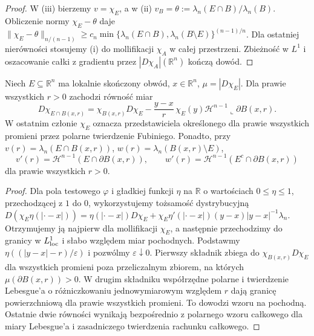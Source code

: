 \begin{proof}
W (iii) bierzemy $v=\chi_E$, a w (ii)
$v_B=\theta:=\lambda_n(E\cap B)/\lambda_n(B)$.
Obliczenie normy $\chi_E-\theta$ daje
$\|\chi_E-\theta\|_{n/(n-1)}\ge
 c_n\min\{\lambda_n(E\cap B),\lambda_n(B\setminus E)\}^{(n-1)/n}$.
Dla ostatniej nierówności stosujemy (i) do
mollifikacji $\chi_A$ w całej przestrzeni.
Zbieżność w $L^1$ i oszacowanie całki z gradientu
przez $|D\chi_A|(\mathbb R^n)$ kończą dowód.
\end{proof}

\begin{lemat}
\label{lem:dg-ball-cut}
Niech $E\subseteq\mathbb R^n$ ma lokalnie skończony obwód,
$x\in\mathbb R^n$, $\mu=|D\chi_E|$.
Dla prawie wszystkich $r>0$ zachodzi równość miar
\[
 D\chi_{E\cap B(x,r)}
 =\chi_{B(x,r)}D\chi_E
 -\frac{y-x}{r}\,\chi_E(y)
 \mathcal H^{n-1}\llcorner\partial B(x,r).
\]
W ostatnim członie $\chi_E$ oznacza przedstawiciela
określonego dla prawie wszystkich promieni przez
polarne twierdzenie Fubiniego. Ponadto, przy
$v(r)=\lambda_n(E\cap B(x,r))$,
$w(r)=\lambda_n(B(x,r)\setminus E)$,
\[
 v'(r)=\mathcal H^{n-1}(E\cap\partial B(x,r)),\qquad
 w'(r)=\mathcal H^{n-1}(E^c\cap\partial B(x,r))
\]
dla prawie wszystkich $r>0$.
\end{lemat}
\begin{proof}
Dla pola testowego $\varphi$ i gładkiej
funkcji $\eta$ na $\mathbb R$ o wartościach
$0\le\eta\le1$, przechodzącej z $1$ do $0$,
wykorzystujemy tożsamość dystrybucyjną
$D(\chi_E\eta(|\cdot-x|))=
\eta(|\cdot-x|)D\chi_E+
\chi_E\eta'(|\cdot-x|)(y-x)|y-x|^{-1}\lambda_n$.
Otrzymujemy ją najpierw dla mollifikacji $\chi_E$,
a następnie przechodzimy do granicy w $L^1_{\rm loc}$
i słabo względem miar pochodnych. Podstawmy
$\eta((|y-x|-r)/\varepsilon)$ i pozwólmy
$\varepsilon\downarrow0$. Pierwszy składnik
zbiega do $\chi_{B(x,r)}D\chi_E$ dla wszystkich
promieni poza przeliczalnym zbiorem, na których
$\mu(\partial B(x,r))>0$. W drugim składniku
współrzędne polarne i twierdzenie Lebesgue'a
o różniczkowaniu jednowymiarowym względem $r$
dają granicę powierzchniową dla prawie wszystkich
promieni. To dowodzi wzoru na pochodną.
Ostatnie dwie równości wynikają bezpośrednio
z polarnego wzoru całkowego dla miary Lebesgue'a
i zasadniczego twierdzenia rachunku całkowego.
\end{proof}

